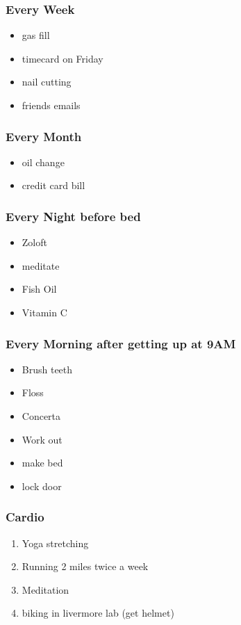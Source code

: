 \begin{frame}
\frametitle{Every Week}
\begin{itemize}
\item gas fill 
\item timecard on Friday 
\item nail cutting 
\item friends emails 
\end{itemize}
\end{frame} 

\begin{frame}
\frametitle{Every Month}
\begin{itemize}
\item oil change
\item credit card bill
\end{itemize} 
\end{frame} 

\begin{frame}
\frametitle{Every Night before bed}
\begin{itemize}
\item Zoloft 
\item meditate
\item Fish Oil
\item Vitamin C
\end{itemize} 
\end{frame} 

\begin{frame}
\frametitle{Every Morning after getting up at 9AM}
\begin{itemize}
\item Brush teeth
\item Floss
\item Concerta
\item Work out
\item make bed 
\item lock door
\end{itemize} 
\end{frame} 

\begin{frame}
\frametitle{Cardio} 
\begin{enumerate} 
\item \tiny Yoga stretching
\item \tiny Running 2 miles twice a week
\item \tiny Meditation 
\item \tiny biking in livermore lab (get helmet) 
\end{enumerate} 
\end{frame} 

